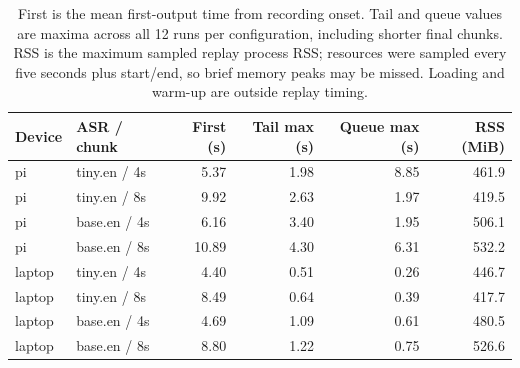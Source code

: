 \begin{table}[htbp]
\centering
\small
\begin{tabular}{llrrrr}
\toprule
Device & ASR / chunk & First (s) & Tail max (s) & Queue max (s) & RSS (MiB) \\
\midrule
pi & tiny.en / 4s & 5.37 & 1.98 & 8.85 & 461.9 \\
pi & tiny.en / 8s & 9.92 & 2.63 & 1.97 & 419.5 \\
pi & base.en / 4s & 6.16 & 3.40 & 1.95 & 506.1 \\
pi & base.en / 8s & 10.89 & 4.30 & 6.31 & 532.2 \\
laptop & tiny.en / 4s & 4.40 & 0.51 & 0.26 & 446.7 \\
laptop & tiny.en / 8s & 8.49 & 0.64 & 0.39 & 417.7 \\
laptop & base.en / 4s & 4.69 & 1.09 & 0.61 & 480.5 \\
laptop & base.en / 8s & 8.80 & 1.22 & 0.75 & 526.6 \\
\bottomrule
\end{tabular}
\caption{First is the mean first-output time from recording onset. Tail and queue values are maxima across all 12 runs per configuration, including shorter final chunks. RSS is the maximum sampled replay process RSS; resources were sampled every five seconds plus start/end, so brief memory peaks may be missed. Loading and warm-up are outside replay timing.}
\label{tab:operational-results}
\end{table}

